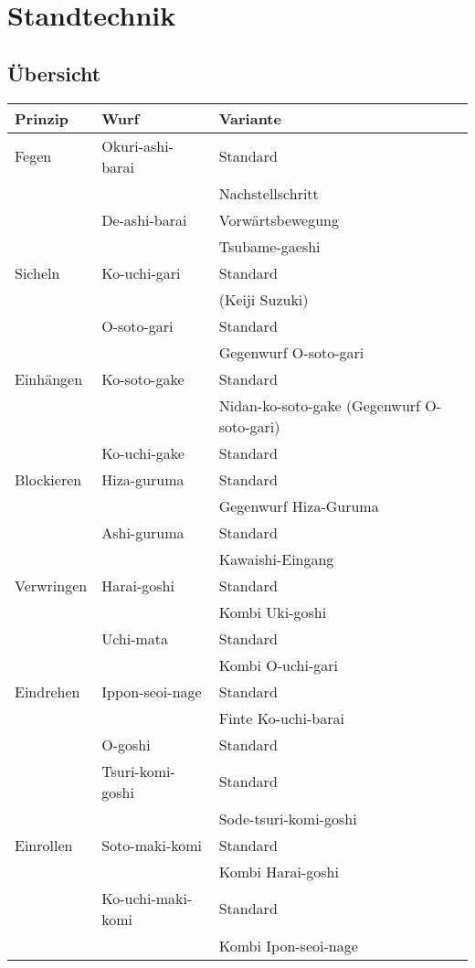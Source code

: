 \documentclass[justified, a4paper, notitlepage, captions=tableheading, nobib]{tufte-handout}
\begin{document}
\newpage
\section{Standtechnik }
\label{sec:org740c962}
\subsection{Übersicht}
\label{sec:org5b02f4c}
\begin{center}
\begin{tabular}{lll}
Prinzip & Wurf & Variante\\
\hline
Fegen & Okuri-ashi-barai & Standard\\
 &  & Nachstellschritt\\
 & De-ashi-barai & Vorwärtsbewegung\\
 &  & Tsubame-gaeshi\\
Sicheln & Ko-uchi-gari & Standard\\
 &  & (Keiji Suzuki)\footnotemark\\
 & O-soto-gari & Standard\\
 &  & Gegenwurf O-soto-gari\\
Einhängen & Ko-soto-gake & Standard\\
 &  & Nidan-ko-soto-gake (Gegenwurf O-soto-gari)\\
 & Ko-uchi-gake & Standard\\
Blockieren & Hiza-guruma & Standard\\
 &  & Gegenwurf Hiza-Guruma\\
 & Ashi-guruma & Standard\\
 &  & Kawaishi-Eingang\\
Verwringen & Harai-goshi & Standard\\
 &  & Kombi Uki-goshi\\
 & Uchi-mata & Standard\\
 &  & Kombi O-uchi-gari\\
Eindrehen & Ippon-seoi-nage & Standard\\
 &  & Finte Ko-uchi-barai\\
 & O-goshi & Standard\\
 & Tsuri-komi-goshi & Standard\\
 &  & Sode-tsuri-komi-goshi\\
Einrollen & Soto-maki-komi & Standard\\
 &  & Kombi Harai-goshi\\
 & Ko-uchi-maki-komi & Standard\\
 &  & Kombi Ipon-seoi-nage\\

\end{tabular}
\end{center}
\end{document}
